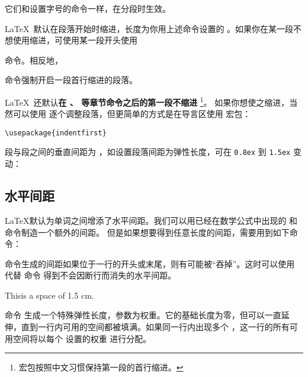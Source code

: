 它们和设置字号的命令一样，在分段时生效。

\LaTeX\ 默认在段落开始时缩进，长度为你用上述命令设置的 。如果你在某一段不想使用缩进，可使用某一段开头使用
\begin{command}
\end{command}
命令。相反地，
\begin{command}
\end{command}
命令强制开启一段首行缩进的段落。

\LaTeX\ 还默认\textbf{在 、 等章节命令之后的第一段不缩进}%
\footnote{ 宏包按照中文习惯保持第一段的首行缩进。}。
如果你想使之缩进，当然可以使用  逐个调整段落，但更简单的方式是在导言区使用  宏包：
\begin{verbatim}
\usepackage{indentfirst}
\end{verbatim}

段与段之间的垂直间距为 ，如设置段落间距为弹性长度，可在 \texttt{0.8ex} 到 \texttt{1.5ex} 变动：
\begin{command}
\end{command}

\subsection{水平间距}\label{subsec:hspace}

\LaTeX 默认为单词之间增添了水平间距。我们可以用已经在数学公式中出现的  和  命令制造一个额外的间距。
但是如果想要得到任意长度的间距，需要用到如下命令：
\begin{command}
\end{command}

 命令生成的间距如果位于一行的开头或末尾，则有可能被“吞掉”。这时可以使用  代替  命令
得到不会因断行而消失的水平间距。

\begin{example}
This\hspace{1.5cm}is a space
of 1.5 cm.
\end{example}

命令  生成一个特殊弹性长度，参数为权重。它的基础长度为零，但可以一直延伸，直到一行内可用的空间都被填满。如果同一行内出现多个 
，这一行的所有可用空间将以每个  设置的权重  进行分配。

